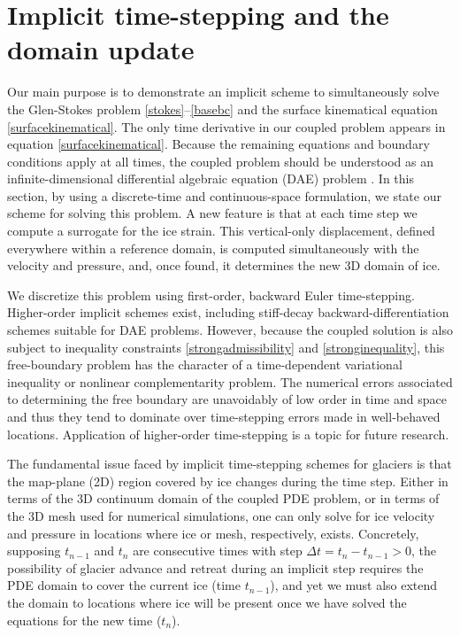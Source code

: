 \documentclass[letterpaper,final,12pt,reqno]{amsart}
\begin{document}
\section{Implicit time-stepping and the domain update} \label{sec:implicitstep}

Our main purpose is to demonstrate an implicit scheme to simultaneously solve the Glen-Stokes problem \eqref{stokes}--\eqref{basebc} and the surface kinematical equation \eqref{surfacekinematical}.  The only time derivative in our coupled problem appears in equation \eqref{surfacekinematical}.  Because the remaining equations and boundary conditions apply at all times, the coupled problem should be understood as an infinite-dimensional differential algebraic equation (DAE) problem \cite{AscherPetzold1998}.  In this section, by using a discrete-time and continuous-space formulation, we state our scheme for solving this problem.  A new feature is that at each time step we compute a surrogate for the ice strain.  This vertical-only displacement, defined everywhere within a reference domain, is computed simultaneously with the velocity and pressure, and, once found, it determines the new 3D domain of ice.

We discretize this problem using first-order, backward Euler time-stepping.  Higher-order implicit schemes exist, including stiff-decay backward-differentiation schemes \cite{AscherPetzold1998,Bueler2021} suitable for DAE problems.  However, because the coupled solution is also subject to inequality constraints \eqref{strongadmissibility} and \eqref{stronginequality}, this free-boundary problem has the character of a time-dependent variational inequality \cite{Calvoetal2002} or nonlinear complementarity \cite{Bueler2016} problem.  The numerical errors associated to determining the free boundary are unavoidably of low order in time and space \cite{Bueler2020} and thus they tend to dominate over time-stepping errors made in well-behaved locations.  Application of higher-order time-stepping is a topic for future research.

The fundamental issue faced by implicit time-stepping schemes for glaciers is that the map-plane (2D) region covered by ice changes during the time step.  Either in terms of the 3D continuum domain of the coupled PDE problem, or in terms of the 3D mesh used for numerical simulations, one can only solve for ice velocity and pressure in locations where ice or mesh, respectively, exists.  Concretely, supposing $t_{n-1}$ and $t_n$ are consecutive times with step $\Delta t = t_n - t_{n-1} > 0$, the possibility of glacier advance and retreat during an implicit step requires the PDE domain to cover the current ice (time $t_{n-1}$), and yet we must also extend the domain to locations where ice will be present once we have solved the equations for the new time ($t_n$).
\end{document}
